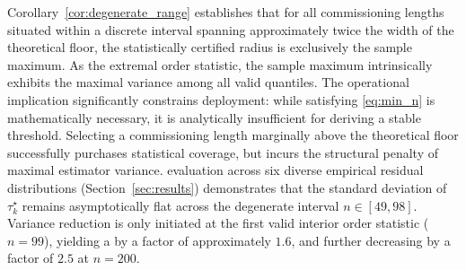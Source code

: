 \documentclass[a4paper]{cas-sc}
\begin{document}
Corollary~\ref{cor:degenerate_range} establishes that for all commissioning lengths situated within a discrete interval spanning approximately twice the width of the theoretical floor, the statistically certified radius is exclusively the sample maximum. As the extremal order statistic, the sample maximum intrinsically exhibits the maximal variance among all valid quantiles. The operational implication significantly constrains deployment: while satisfying \eqref{eq:min_n} is mathematically necessary, it is analytically insufficient for deriving a stable threshold. Selecting a commissioning length marginally above the theoretical floor successfully purchases statistical coverage, but incurs the structural penalty of maximal estimator variance.  evaluation across six diverse empirical residual distributions (Section~\ref{sec:results}) demonstrates that the standard deviation of \(\tau_k^\star\) remains asymptotically flat across the degenerate interval \(n\in[49,98]\). Variance reduction is only initiated at the first valid interior order statistic (\(n=99\)), yielding a  by a factor of approximately \(1.6\), and further decreasing by a factor of \(2.5\) at \(n=200\). 
\end{document}

